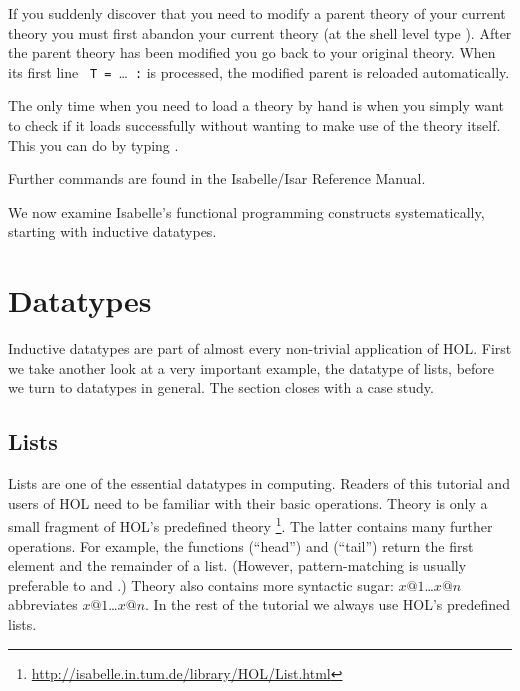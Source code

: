 \begin{description}
  If you suddenly discover that you need to modify a parent theory of your
  current theory you must first abandon your current theory (at the shell
  level type ). After the parent theory has
  been modified you go back to your original theory. When its first line
  \texttt{~T~=}~\dots~\texttt{:} is processed, the
  modified parent is reloaded automatically.
  
  The only time when you need to load a theory by hand is when you simply
  want to check if it loads successfully without wanting to make use of the
  theory itself. This you can do by typing
  .
\end{description}
Further commands are found in the Isabelle/Isar Reference Manual.

We now examine Isabelle's functional programming constructs systematically,
starting with inductive datatypes.


\section{Datatypes}
\label{sec:datatype}

Inductive datatypes are part of almost every non-trivial application of HOL.
First we take another look at a very important example, the datatype of
lists, before we turn to datatypes in general. The section closes with a
case study.


\subsection{Lists}

Lists are one of the essential datatypes in computing. Readers of this
tutorial and users of HOL need to be familiar with their basic operations.
Theory  is only a small fragment of HOL's predefined theory
\footnote{\url{http://isabelle.in.tum.de/library/HOL/List.html}}.
The latter contains many further operations. For example, the functions
 (``head'') and  (``tail'') return the first
element and the remainder of a list. (However, pattern-matching is usually
preferable to  and .)  Theory  also contains
more syntactic sugar: \isa{[}$x@1$\isa{,}\dots\isa{,}$x@n$\isa{]} abbreviates
$x@1$\isa{\#}\dots\isa{\#}$x@n$\isa{\#[]}.  In the rest of the tutorial we
always use HOL's predefined lists.



